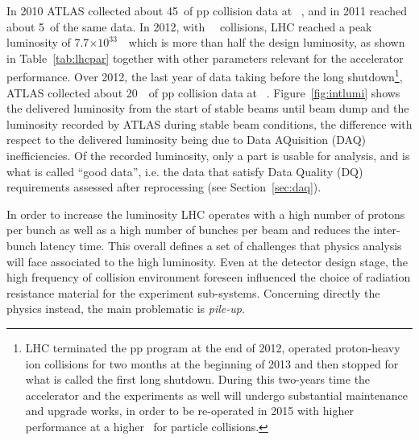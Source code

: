 In 2010 ATLAS collected about 45~\ipb of pp collision data at ~\tev, and in
2011 reached about 5~\ifb of the same data.
In 2012, with  ~\tev\ collisions, LHC reached a peak luminosity of 7.7$\times10^{33}$~\ which is
more than half the design luminosity, as shown in Table~\ref{tab:lhcpar} together
with other parameters relevant for the accelerator performance. 
Over 2012, the last
year of data taking before the long shutdown\footnote{LHC terminated the pp program
at the end of 2012, operated proton-heavy ion collisions for two months at the beginning
of 2013 and then stopped for what is called the first long shutdown. During this two-years
time the accelerator and the experiments as well will undergo substantial maintenance and 
upgrade works, in order to be re-operated in 2015 with higher performance at a higher
\cme\ for particle collisions.},
ATLAS collected about 20~\ifb\ of pp collision data at ~\tev.
Figure~\ref{fig:intlumi} shows the delivered luminosity from the start of stable beams until beam dump and the luminosity recorded by
ATLAS during stable beam conditions, the difference with respect to the delivered luminosity being due to Data AQuisition (DAQ)
inefficiencies. Of the recorded luminosity, only a part is usable for analysis, and is what is called ``good data'', i.e. 
the data that satisfy Data Quality (DQ) requirements assessed after reprocessing (see Section~\ref{sec:daq}).

In order to increase the luminosity LHC operates with a high number of protons per bunch as well as a high
 number of bunches per beam and reduces the inter-bunch latency time.
This overall defines a set of challenges that physics analysis will face associated to the high luminosity.
Even at the detector design stage, the high frequency of collision environment foreseen influenced
the choice of radiation resistance material for the experiment sub-systems. Concerning directly the physics
instead, the main problematic is \textit{pile-up}.

